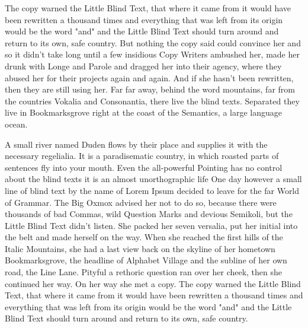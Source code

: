 \documentclass{xminimal}
\begin{document}
The copy warned the Little Blind Text, that where it came from it would have
been rewritten a thousand times and everything that was left from its origin
would be the word "and" and the Little Blind Text should turn around and return
to its own, safe country. But nothing the copy said could convince her and so
it didn’t take long until a few insidious Copy Writers ambushed her, made her
drunk with Longe and Parole and dragged her into their agency, where they abused
her for their projects again and again. And if she hasn’t been rewritten,
then they are still using her. Far far away, behind the word mountains,
far from the countries Vokalia and Consonantia, there live the blind texts.
Separated they live in Bookmarksgrove right at the coast of the Semantics,
a large language ocean.

A small river named Duden flows by their place and supplies it with
the necessary regelialia. It is a paradisematic country, in which roasted parts
of sentences fly into your mouth. Even the all-powerful Pointing has no control
about the blind texts it is an almost unorthographic life One day however
a small line of blind text by the name of Lorem Ipsum decided to leave for
the far World of Grammar. The Big Oxmox advised her not to do so, because there
were thousands of bad Commas, wild Question Marks and devious Semikoli,
but the Little Blind Text didn’t listen. She packed her seven versalia, put her
initial into the belt and made herself on the way. When she reached the first
hills of the Italic Mountains, she had a last view back on the skyline of her
hometown Bookmarksgrove, the headline of Alphabet Village and the subline of her
own road, the Line Lane. Pityful a rethoric question ran over her cheek,
then she continued her way. On her way she met a copy. The copy warned
the Little Blind Text, that where it came from it would have been rewritten
a thousand times and everything that was left from its origin would be
the word "and" and the Little Blind Text should turn around and return to
its own, safe country.
\end{document}
